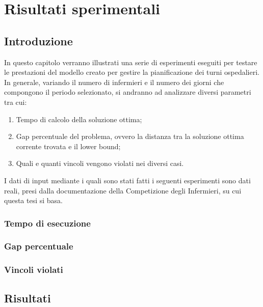 \chapter{Risultati sperimentali}\label{ch:chapter3}

\section{Introduzione}
In questo capitolo verranno illustrati una serie di esperimenti eseguiti per testare le prestazioni del modello creato per gestire la pianificazione dei turni ospedalieri.
In generale, variando il numero di infermieri e il numero dei giorni che compongono il periodo selezionato, si andranno ad analizzare diversi parametri tra cui:
\begin{enumerate}
\item Tempo di calcolo della soluzione ottima;
\item Gap percentuale del problema, ovvero la distanza tra la soluzione ottima corrente trovata e il lower bound;
\item Quali e quanti vincoli vengono violati nei diversi casi.
\end{enumerate}

I dati di input mediante i quali sono stati fatti i seguenti esperimenti sono dati reali, presi dalla documentazione della Competizione degli Infermieri, su cui questa tesi si basa.

\subsection{Tempo di esecuzione}


\subsection{Gap percentuale}


\subsection{Vincoli violati}


\section{Risultati}